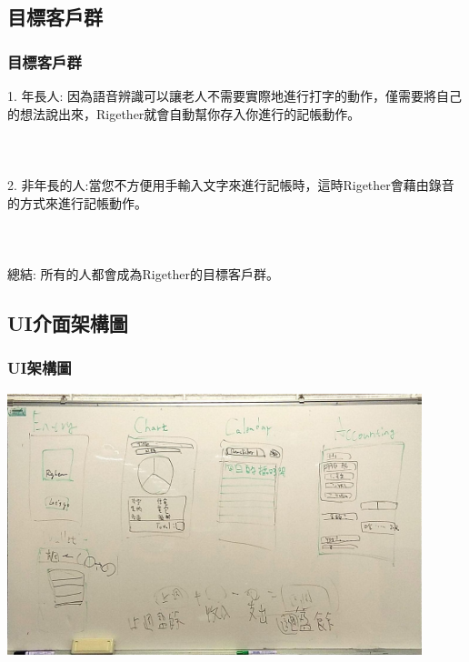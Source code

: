 \documentclass{beamer}
\begin{document}


\subsection{目標客戶群} %

\begin{frame}
\frametitle{目標客戶群}
1. 年長人: 因為語音辨識可以讓老人不需要實際地進行打字的動作，僅需要將自己的想法說出來，Rigether就會自動幫你存入你進行的記帳動作。\\~\\~\\~\\

2. 非年長的人:當您不方便用手輸入文字來進行記帳時，這時Rigether會藉由錄音的方式來進行記帳動作。\\~\\~\\~\\


總結: 所有的人都會成為Rigether的目標客戶群。
\end{frame}


\subsection{UI介面架構圖} %

\begin{frame}
\frametitle{UI架構圖}
\includegraphics[width=4.75in,height=3in]{structure.jpg}\\~\\

\end{frame}
\end{document}
